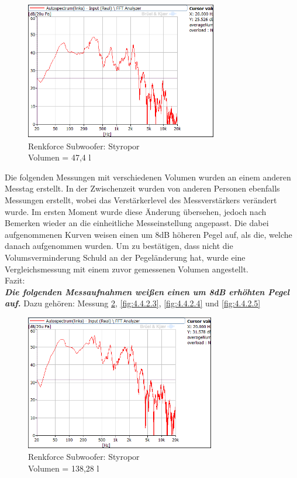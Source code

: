 \begin{figure} [H]
\centering
\includegraphics[width=0.75\textwidth]{img/Optimierung/Sub/RenkforceStyro_47l.png}
\caption{Renkforce Subwoofer: Styropor \\Volumen = 47,4 l}
\label{fig:4.4.2.1}
\end{figure}

Die folgenden Messungen mit verschiedenen Volumen wurden an einem anderen Messtag erstellt.
In der Zwischenzeit wurden von anderen Personen ebenfalls Messungen erstellt, wobei das Verstärkerlevel des Messverstärkers verändert wurde.
Im ersten Moment wurde diese Änderung übersehen, jedoch nach Bemerken wieder an die einheitliche Messeinstellung angepasst.
Die dabei aufgenommenen Kurven weisen einen um 8dB höheren Pegel auf, als die, welche danach aufgenommen wurden.
Um zu bestätigen, dass nicht die Volumsverminderung Schuld an der Pegeländerung hat, wurde eine Vergleichsmessung mit einem zuvor gemessenen Volumen angestellt.\\

Fazit:\\ 
\textit{\textbf{ Die folgenden Messaufnahmen weißen einen um 8dB erhöhten Pegel auf.}} Dazu gehören: Messung \ref{fig:4.4.2.2}, \ref{fig:4.4.2.3}, \ref{fig:4.4.2.4} und \ref{fig:4.4.2.5}

\begin{figure} [H]
\centering
\includegraphics[width=0.74\textwidth]{img/Optimierung/Sub/RenkforceStyro_138l.png}
\caption{Renkforce Subwoofer: Styropor \\Volumen = 138,28 l}
\label{fig:4.4.2.2}
\end{figure}

